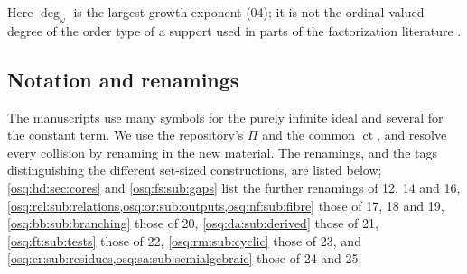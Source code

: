 \documentclass[11pt,letterpaper]{article}
\numberwithin{equation}{section}
\theoremstyle{definition}
\theoremstyle{remark}
\theoremstyle{plain}
\newcommand{\ct}{\operatorname{ct}}
\newcommand{\degw}{\deg_{\omega}}
\begin{document}
Here $\degw$ is the largest growth exponent (04); it is not the ordinal-valued degree of
the order type of a support used in parts of the factorization literature \cite{LM}.

\subsection{Notation and renamings}\label{osq:sub:notation}
The manuscripts use many symbols for the purely infinite ideal and several for the
constant term. We use the repository's $\Pi$ and the common $\ct$, and resolve every
collision by renaming in the new material. The renamings, and the tags distinguishing
the different set-sized constructions, are listed below; \cref{osq:hd:sec:cores} and
\cref{osq:fs:sub:gaps} list the further renamings of 12, 14 and 16,
\cref{osq:rel:sub:relations,osq:or:sub:outputs,osq:nf:sub:fibre} those of 17, 18 and 19, \cref{osq:bb:sub:branching}
those of 20, \cref{osq:da:sub:derived} those of 21, \cref{osq:ft:sub:tests} those of 22, \cref{osq:rm:sub:cyclic} those of 23, and
\cref{osq:cr:sub:residues,osq:sa:sub:semialgebraic} those of 24 and 25.
\end{document}
